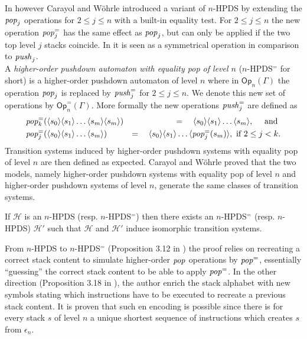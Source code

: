\documentclass[a4paper,UKenglish,cleveref, autoref, thm-restate]{lipics-v2021}
\renewcommand{\H}{\mathcal{H}}
\newcommand{\Op}{\mathsf{Op}}
\begin{document}
In \cite{CaWoe03, Woeh05, carayol2006automates} however 
Carayol and W\"ohrle
 introduced a variant of $n$-HPDS by extending the 
$\text{\textit{pop}}_j$ operations for $2 \leq j \leq n$ with a built-in equality test. 
For $2 \leq j \leq n$ 
the new operation
$\text{\textit{pop}}_j^=$ has the same effect as $\text{\textit{pop}}_j$, but
can only be applied if the two top level $j$ stacks coincide.
In \cite{carayol2006automates} it is seen as a symmetrical operation in comparison to
$\text{\textit{push}}_j$.\\

A {\em higher-order pushdown automaton with equality pop of level $n$} ($n$-HPDS$^=$ for short) 
is a higher-order pushdown automaton of level $n$ where in
$\Op_n(\Gamma)$
 the operation 
 $\text{\textit{pop}}_j$  
  is replaced by 
$\text{\textit{push}}_j^=$
for $2 \leq j \leq n$.
We denote
this new set of operations by 
$\Op_n^=(\Gamma)$. 
More formally the new operations $\text{\textit{push}}_j^=$ are defined as
\begin{eqnarray*}
&\text{\textit{pop}}_k^=( \langle s_0 \rangle \langle s_1 \rangle \ldots  \langle s_m \rangle \langle s_m \rangle) &=\quad  \langle s_0 \rangle \langle s_1 \rangle \ldots \langle s_m \rangle , \quad \text{ and }\\
&\text{\textit{pop}}_j^=( \langle s_0 \rangle \langle s_1 \rangle \ldots \langle s_m \rangle) &=\quad \langle s_0 \rangle \langle s_1 \rangle \ldots 
\langle \text{\textit{pop}}_j^=(s_m) \rangle,
\text{ if } 2 \leq j < k. 
\end{eqnarray*}
%
%
%
%
Transition systems induced by higher-order pushdown systems with equality pop of level $n$
are then defined as expected.  
Carayol and W\"ohrle proved \cite{Woeh05, carayol2006automates} that the two models,
namely
higher-order pushdown systems with equality pop of level $n$
and
higher-order pushdown systems of level $n$,
generate the same classes of transition systems.





\begin{theorem}{\cite{Woeh05, carayol2006automates}}
If $\H$ is an $n$-HPDS (resp. $n$-HPDS$^=$) then there
exists an $n$-HPDS$^=$ (resp. $n$-HPDS) $\H'$ such that
$\H$ and $\H'$ 
induce isomorphic transition systems.
\end{theorem}



From $n$-HPDS to $n$-HPDS$^=$ (Proposition 3.12 in \cite{Woeh05}) the proof relies on recreating a correct stack content to simulate higher-order 
$\text{\textit{pop}}$ operations by $\text{\textit{pop}}^=$, essentially ``guessing'' the correct stack content to be able to apply $\text{\textit{pop}}^=$. 
In the other direction (Proposition 3.18 in \cite{Woeh05}), 
the author
enrich the stack alphabet with new symbols stating which 
instructions have to be executed to recreate a
previous stack content. It is proven that such en encoding is possible since
there is 
for every stack $s$ of level $n$
 a unique shortest sequence of instructions which creates $s$ from
$\epsilon_n$. \\
\end{document}
